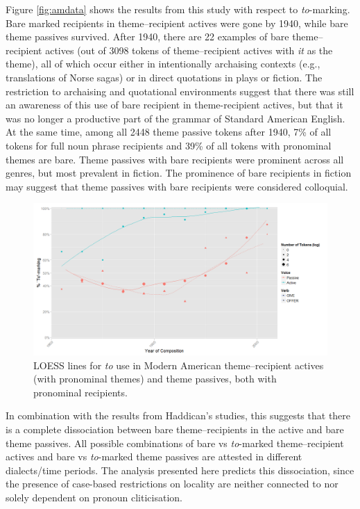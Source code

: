 Figure \ref{fig:amdata} shows the results from this study with respect to \textit{to}-marking. Bare marked recipients in theme--recipient actives were gone by 1940, while bare theme passives survived. After 1940, there are 22 examples of bare theme--recipient actives (out of 3098 tokens of theme--recipient actives with \textit{it} as the theme), all of which occur either in intentionally archaising contexts (e.g., translations of Norse sagas) or in direct quotations in plays or fiction. The restriction to archaising and quotational environments suggest that there was still an awareness of this use of bare recipient in theme-recipient actives, but that it was no longer a productive part of the grammar of Standard American English. At the same time, among all 2448 theme passive tokens after 1940, 7\% of all tokens for full noun phrase recipients and 39\% of all tokens with pronominal themes are bare. Theme passives with bare recipients were prominent across all genres, but most prevalent in fiction. The prominence of bare recipients in fiction may suggest that theme passives with bare recipients were considered colloquial.

\begin{figure}[ht!]

{\centering \includegraphics[width=\linewidth]{../images/recpro_to_am} 

}

\caption{LOESS lines for \textit{to} use in Modern American theme--recipient actives (with pronominal themes) and theme passives, both with pronominal recipients.\label{fig:amdata}}\label{fig:amtoset-graph}
\end{figure}

In combination with the results from Haddican's studies, this suggests that there is a complete dissociation between bare theme--recipients in the active and bare theme passives. All possible combinations of bare vs \textit{to}-marked theme--recipient actives and bare vs \textit{to}-marked theme passives are attested in different dialects/time periods. The analysis presented here predicts this dissociation, since the presence of case-based restrictions on locality are neither connected to nor solely dependent on pronoun cliticisation.

